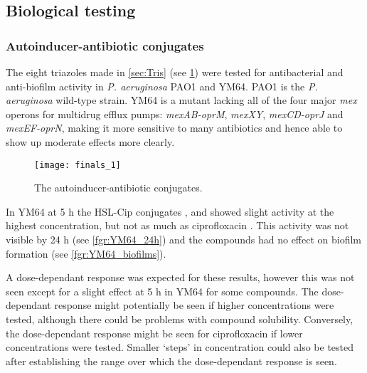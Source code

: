\subsection{Biological testing\label{sec:bio1}}

\subsubsection{Autoinducer-antibiotic conjugates}

The eight triazoles made in \ref{sec:Tris} (see \ref{fgr:finals_1}) were tested for antibacterial and anti-biofilm activity in \textit{P. aeruginosa} PAO1\cite{Stover2000} and YM64\cite{Morita2001}.
PAO1 is the \textit{P. aeruginosa} wild-type strain.
YM64 is a mutant lacking all of the four major \textit{mex} operons for multidrug efflux pumps: \textit{mexAB-oprM}, \textit{mexXY}, \textit{mexCD-oprJ} and \textit{mexEF-oprN}, making it more sensitive to many antibiotics and hence able to show up moderate effects more clearly.

\begin{figure}[H]
	\begin{center}
		\texttt{[image: finals\_1]}
		\caption{The autoinducer-antibiotic conjugates.
 		\label{fgr:finals_1}}
	\end{center}
\end{figure}


In YM64 at 5 h the HSL-Cip conjugates ,  and  showed slight activity at the highest concentration, but not as much as ciprofloxacin .
This activity was not visible by 24 h (see \ref{fgr:YM64_24h}) and the compounds had no effect on biofilm formation (see \ref{fgr:YM64_biofilms}).

A dose-dependant response was expected for these results, however this was not seen except for a slight effect at 5 h in YM64 for some compounds. The dose-dependant response might potentially be seen if higher concentrations were tested, although there could be problems with compound solubility. Conversely, the dose-dependant response might be seen for ciprofloxacin  if lower concentrations were tested. Smaller `steps' in concentration could also be tested after establishing the range over which the dose-dependant response is seen.

